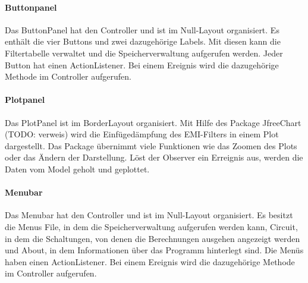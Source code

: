 \paragraph{Buttonpanel} \label{par:buttonpanel}
Das ButtonPanel hat den Controller und ist im Null-Layout organisiert. Es enthält die vier Buttons und zwei dazugehörige Labels. Mit diesen kann die Filtertabelle verwaltet und die Speicherverwaltung aufgerufen werden. Jeder Button hat einen ActionListener. Bei einem Ereignis wird die dazugehörige Methode im Controller  aufgerufen.
\bigskip

\paragraph{Plotpanel} \label{par:plotpanel}
Das PlotPanel ist im BorderLayout organisiert. Mit Hilfe des Package JfreeChart (TODO: verweis) wird die Einfügedämpfung des EMI-Filters in einem Plot dargestellt. Das Package übernimmt viele Funktionen wie das Zoomen des Plots oder das Ändern der Darstellung. Löst der Observer ein Erreignis aus, werden die Daten vom Model geholt und geplottet.
\bigskip

\newpage

\paragraph{Menubar} \label{par:menu}
Das Menubar hat den Controller und ist im Null-Layout organisiert. Es besitzt die Menus File, in dem die Speicherverwaltung aufgerufen werden kann, Circuit, in dem die Schaltungen, von denen die Berechnungen ausgehen angezeigt werden und About, in dem Informationen über das Programm hinterlegt sind. Die Menüs haben einen ActionListener. Bei einem Ereignis wird die dazugehörige Methode im Controller  aufgerufen.


